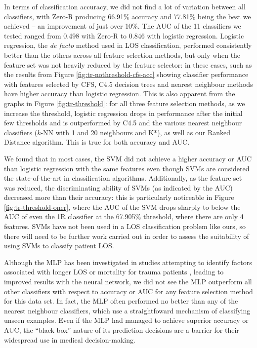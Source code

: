 

In terms of classification accuracy, we did not find a lot of variation
between all classifiers, with Zero-R producing 66.91\% accuracy and 77.81\%
being the best we achieved -- an improvement of just over 10\%. The AUC of
the 11 classifiers we tested ranged from 0.498 with Zero-R to 0.846 with
logistic regression. Logistic regression, the \textit{de facto} method
used in LOS classification, performed consistently better than the others
across all feature
selection methods, but only when the feature set was not heavily reduced by
the feature selector: in these cases, such as the results from Figure
\ref{fig:tr-nothreshold-cfs-acc} showing classifier performance with features
selected by CFS, C4.5 decision trees and nearest
neighbour methods have higher accuracy than logistic regression. This is also
apparent from the graphs in Figure \ref{fig:tr-threshold}: for all three
feature selection methods, as we increase the threshold, logistic regression
drops in performance after the initial few thresholds and is outperformed by
C4.5 and the various nearest neighbour classifiers ($k$-NN with 1 and 20
neighbours and K*), as well as our Ranked Distance algorithm.
This is true for both accuracy and AUC.

We found that in most cases, the SVM did not achieve a higher accuracy or
AUC than logistic regression with the same features even though SVMs are
considered the state-of-the-art in classification algorithms. Additionally,
as the feature set was reduced, the discriminating ability of SVMs (as
indicated by the AUC) decreased more than their accuracy: this is particularly
noticeable in Figure \ref{fig:tr-threshold-oner}, where the AUC of the SVM
drops sharply to below the AUC of even the 1R classifier at the 67.905\%
threshold, where there are
only 4 features. SVMs have not been used in a LOS classification problem like
ours, so there will need to be further work carried out in order to assess the
suitability of using SVMs to classify patient LOS.

Although the MLP has been investigated in studies attempting to identify
factors associated with longer LOS or mortality for trauma patients
\cite{Hunter2000,McGonigal1993}, leading to improved results with the neural
network, we did not see the MLP outperform all other classifiers with respect
to accuracy or AUC for any feature selection method for this data set. In fact,
the MLP often performed no better than any of the nearest neighbour
classifiers, which use a straightfoward mechanism of classifying unseen
examples. Even if the MLP had managed to achieve superior accuracy or AUC, the
``black box'' nature of its prediction decisions are a barrier for their
widespread use in medical decision-making.

